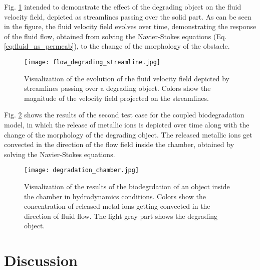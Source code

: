 Fig. \ref{fig:fluid_flow_degrading_streamline} intended to demonstrate the effect of the degrading object on the fluid velocity field, depicted as streamlines passing over the solid part. As can be seen in the figure, the fluid velocity field evolves over time, demonstrating the response of the fluid flow, obtained from solving the Navier-Stokes equations (Eq. \ref{eq:fluid_ns_permeab}), to the change of the morphology of the obstacle. 


\begin{figure}[h]
\centering
\medskip
\texttt{[image: flow\_degrading\_streamline.jpg]}
\caption[Fluid flow streamlines in the presence of a degrading object]{Visualization of the evolution of the fluid velocity field depicted by streamlines passing over a degrading object. Colors show the magnitude of the velocity field projected on the streamlines.} \label{fig:fluid_flow_degrading_streamline}
\end{figure}


Fig. \ref{fig:fluid_degradation_chamber} shows the results of the second test case for the coupled biodegradation model, in which the release of metallic ions is depicted over time along with the change of the morphology of the degrading object. The released metallic ions get convected in the direction of the flow field inside the chamber, obtained by solving the Navier-Stokes equations.


\begin{figure}[h]
\centering
\medskip
\texttt{[image: degradation\_chamber.jpg]}
\caption[Visualization of the biodegradation inside the chamber in presence of fluid flow]{Visualization of the results of the biodegrdation of an object inside the chamber in hydrodynamics conditions. Colors show the concentration of released metal ions getting convected in the direction of fluid flow. The light gray part shows the degrading object.} \label{fig:fluid_degradation_chamber}
\end{figure}


\section{Discussion}















\cleardoublepage

